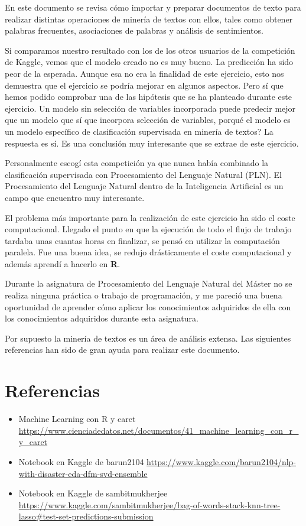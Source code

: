 \documentclass[]{article}
\begin{document}
En este documento se revisa cómo importar y preparar documentos de texto
para realizar distintas operaciones de minería de textos con ellos,
tales como obtener palabras frecuentes, asociaciones de palabras y
análisis de sentimientos.

Si comparamos nuestro resultado con los de los otros usuarios de la
competición de Kaggle, vemos que el modelo creado no es muy bueno. La
predicción ha sido peor de la esperada. Aunque esa no era la finalidad de
este ejercicio, esto nos demuestra que el ejercicio se podría mejorar en
algunos aspectos. Pero sí que hemos podido comprobar una de las hipótesis 
que se ha planteado durante este ejercicio. Un modelo sin selección de variables 
incorporada puede predecir mejor que un modelo que sí que incorpora selección de 
variables, porqué el modelo es un modelo específico de clasificación supervisada 
en minería de textos? La respuesta es sí. Es una conclusión muy interesante que 
se extrae de este ejercicio.

Personalmente escogí esta competición ya que nunca había combinado la
clasificación supervisada con Procesamiento del Lenguaje Natural (PLN).
El Procesamiento del Lenguaje Natural dentro de la Inteligencia
Artificial es un campo que encuentro muy interesante.

El problema más importante para la realización de este ejercicio ha sido
el coste computacional. Llegado el punto en que la ejecución de todo el
flujo de trabajo tardaba unas cuantas horas en finalizar, se pensó en utilizar la
computación paralela. Fue una buena idea, se redujo drásticamente el
coste computacional y además aprendí a hacerlo en \textbf{R}.

Durante la asignatura de Procesamiento del Lenguaje Natural del Máster
no se realiza ninguna práctica o trabajo de programación, y me pareció una buena
oportunidad de aprender cómo aplicar los conocimientos adquiridos de ella con los conocimientos adquiridos
durante esta asignatura.

Por supuesto la minería de textos es un área de análisis extensa. Las
siguientes referencias han sido de gran ayuda para realizar este
documento.

\hypertarget{referencias}{%
\section{Referencias}\label{referencias}}

\begin{itemize}
\item
  Machine Learning con R y caret
  \url{https://www.cienciadedatos.net/documentos/41_machine_learning_con_r_y_caret}
\item
  Notebook en Kaggle de barun2104
  \url{https://www.kaggle.com/barun2104/nlp-with-disaster-eda-dfm-svd-ensemble}
\item
  Notebook en Kaggle de sambitmukherjee
  \url{https://www.kaggle.com/sambitmukherjee/bag-of-words-stack-knn-tree-lasso\#test-set-predictions-submission}
\end{itemize}
\end{document}

